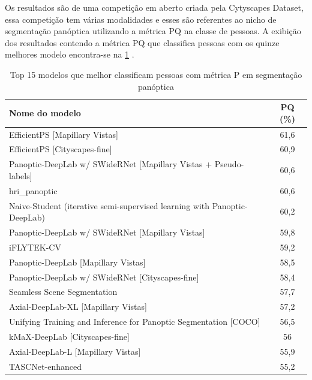 
Os resultados são de uma competição em aberto criada pela Cytyscapes Dataset, essa competição tem várias modalidades e esses são referentes ao nicho de segmentação panóptica utilizando a métrica PQ na classe de pessoas. A exibição dos resultados contendo a métrica PQ que classifica pessoas com os quinze melhores modelo encontra-se na \cref{tab:resultados-cityscapes} \space\cite{datasetResults}.
\begin{table}[h]
	\centering
	\caption{Top 15 modelos que melhor classificam pessoas com métrica P em segmentação panóptica}
	\label{tab:resultados-cityscapes}
	\begin{tabular}{|l|c|}
	  \hline
	  Nome do modelo & PQ (\%) \\
	  \hline
	  EfficientPS [Mapillary Vistas] & 61,6 \\
	  EfficientPS [Cityscapes-fine] & 60,9 \\
	  Panoptic-DeepLab w/ SWideRNet [Mapillary Vistas + Pseudo-labels] & 60,6 \\
	  hri\_panoptic & 60,6 \\
	  Naive-Student (iterative semi-supervised learning with Panoptic-DeepLab) & 60,2 \\
	  Panoptic-DeepLab w/ SWideRNet [Mapillary Vistas] & 59,8 \\
	  iFLYTEK-CV & 59,2 \\
	  Panoptic-DeepLab [Mapillary Vistas] & 58,5 \\
	  Panoptic-DeepLab w/ SWideRNet [Cityscapes-fine] & 58,4 \\
	  Seamless Scene Segmentation & 57,7 \\
	  Axial-DeepLab-XL [Mapillary Vistas] & 57,2 \\
	  Unifying Training and Inference for Panoptic Segmentation [COCO] & 56,5 \\
	  kMaX-DeepLab [Cityscapes-fine] & 56 \\
	  Axial-DeepLab-L [Mapillary Vistas] & 55,9 \\
	  TASCNet-enhanced & 55,2 \\
	  \hline
	\end{tabular}
  \end{table}



